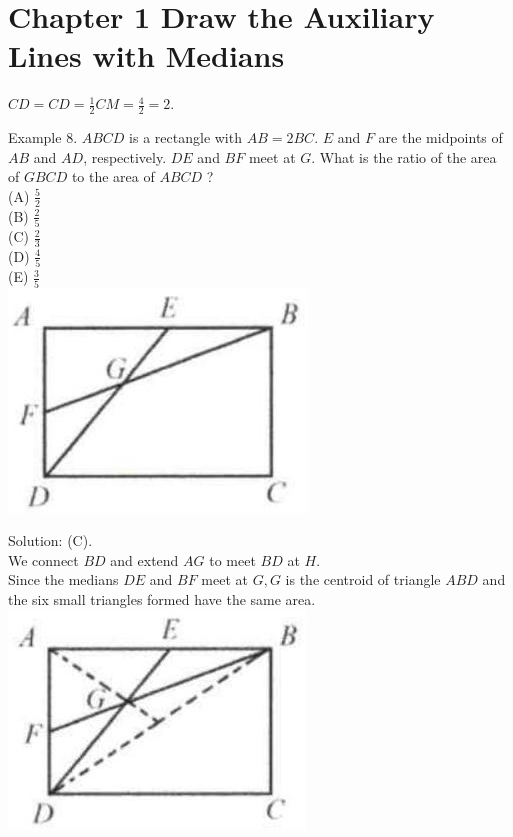 \documentclass[10pt]{article}
\begin{document}
\section*{Chapter 1 Draw the Auxiliary Lines with Medians}
\(C D=C D=\frac{1}{2} C M=\frac{4}{2}=2\).

Example 8. \(A B C D\) is a rectangle with \(A B=2 B C\). \(E\) and \(F\) are the midpoints of \(A B\) and \(A D\), respectively. \(D E\) and \(B F\) meet at \(G\). What is the ratio of the area of \(G B C D\) to the area of \(A B C D\) ?\\
(A) \(\frac{5}{2}\)\\
(B) \(\frac{2}{5}\)\\
(C) \(\frac{2}{3}\)\\
(D) \(\frac{4}{5}\)\\
(E) \(\frac{3}{5}\)\\
\includegraphics[max width=\textwidth, center]{2025_04_17_97bc1f7e44d93c271a88g-011}

Solution: (C).\\
We connect \(B D\) and extend \(A G\) to meet \(B D\) at \(H\).\\
Since the medians \(D E\) and \(B F\) meet at \(G, G\) is the centroid of triangle \(A B D\) and the six small triangles formed have the same area.\\
\includegraphics[max width=\textwidth, center]{2025_04_17_97bc1f7e44d93c271a88g-011(1)}
\end{document}
